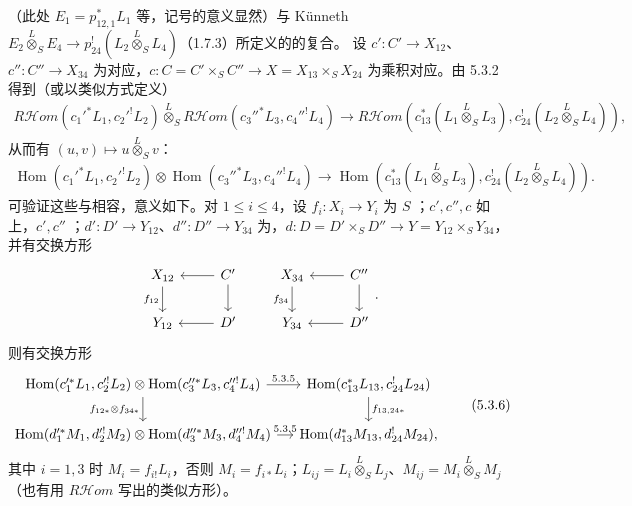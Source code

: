 （此处 $E_1=p_{12,1}^*L_1$ 等，记号的意义显然）与 Künneth  $E_2\mathbin{\overset L\otimes}_SE_4\to p_{24}^!(L_2\mathbin{\overset L\otimes}_SL_4)$（1.7.3）所定义的的复合。
设 $c':C'\to X_{12}$、$c'':C''\to X_{34}$ 为对应，$c:C=C'\times_SC''\to X=X_{13}\times_SX_{24}$ 为乘积对应。由 5.3.2 得到（或以类似方式定义）
\[\begin{split}
R\mathcal Hom(c_1'^*L_1,c_2'^!L_2)\mathbin{\overset L\otimes}_SR\mathcal Hom(c_3''^*L_3,c_4''^!L_4)\longrightarrow R\mathcal Hom(c_{13}^*(L_1\mathbin{\overset L\otimes}_SL_3),c_{24}^!(L_2\mathbin{\overset L\otimes}_SL_4)),
\end{split}\tag{5.3.4}\]
从而有 $(u,v)\mapsto u\mathbin{\overset L\otimes}_Sv$：
\[\begin{split}
\operatorname{Hom}(c_1'^*L_1,c_2'^!L_2)\otimes\operatorname{Hom}(c_3''^*L_3,c_4''^!L_4)\longrightarrow\operatorname{Hom}(c_{13}^*(L_1\mathbin{\overset L\otimes}_SL_3),c_{24}^!(L_2\mathbin{\overset L\otimes}_SL_4)).
\end{split}\tag{5.3.5}\]
可验证这些与相容，意义如下。对 $1\leq i\leq4$，设 $f_i:X_i\to Y_i$ 为 $S$ ；$c',c'',c$ 如上，$c',c''$ ；$d':D'\to Y_{12}$、$d'':D''\to Y_{34}$ 为，$d:D=D'\times_SD''\to Y=Y_{12}\times_SY_{34}$，并有交换方形
\[\begin{tikzcd}X_{12}\arrow[d,"f_{12}"']&C'\arrow[l]\arrow[d]\\Y_{12}&D'\arrow[l]\end{tikzcd}\qquad\begin{tikzcd}X_{34}\arrow[d,"f_{34}"']&C''\arrow[l]\arrow[d]\\Y_{34}&D''\arrow[l]\end{tikzcd}.\]
则有交换方形
\[\begin{tikzcd}[column sep=small]
\operatorname{Hom}(c_1'^*L_1,c_2'^!L_2)\otimes\operatorname{Hom}(c_3''^*L_3,c_4''^!L_4)\arrow[r,"5.3.5"]\arrow[d,"{f_{12*}\otimes f_{34*}}"']&\operatorname{Hom}(c_{13}^*L_{13},c_{24}^!L_{24})\arrow[d,"{f_{13,24*}}"]\\
\operatorname{Hom}(d_1'^*M_1,d_2'^!M_2)\otimes\operatorname{Hom}(d_3''^*M_3,d_4''^!M_4)\arrow[r,"5.3.5"]&\operatorname{Hom}(d_{13}^*M_{13},d_{24}^!M_{24}),
\end{tikzcd}\tag{5.3.6}\]
其中 $i=1,3$ 时 $M_i=f_{i!}L_i$，否则 $M_i=f_{i*}L_i$；$L_{ij}=L_i\mathbin{\overset L\otimes}_SL_j$、$M_{ij}=M_i\mathbin{\overset L\otimes}_SM_j$（也有用 $R\mathcal Hom$ 写出的类似方形）。

